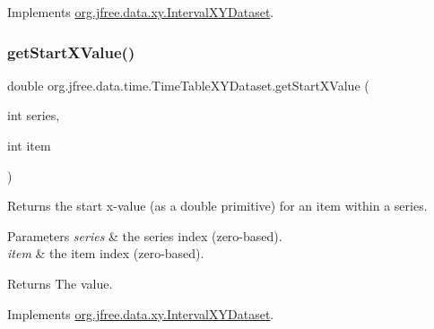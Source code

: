 Implements \mbox{\hyperlink{interfaceorg_1_1jfree_1_1data_1_1xy_1_1_interval_x_y_dataset_a7548ec7d60d72463313dc6f10aceee62}{org.\+jfree.\+data.\+xy.\+Interval\+X\+Y\+Dataset}}.

\mbox{\label{classorg_1_1jfree_1_1data_1_1time_1_1_time_table_x_y_dataset_a0173db781cf6ea359c9937b4bbac4dd1}} 
\subsubsection{\texorpdfstring{get\+Start\+X\+Value()}{getStartXValue()}}
{\footnotesize\ttfamily double org.\+jfree.\+data.\+time.\+Time\+Table\+X\+Y\+Dataset.\+get\+Start\+X\+Value (\begin{DoxyParamCaption}\item[{int}]{series,  }\item[{int}]{item }\end{DoxyParamCaption})}

Returns the start x-\/value (as a double primitive) for an item within a series.


\begin{DoxyParams}{Parameters}
{\em series} & the series index (zero-\/based). \\
\hline
{\em item} & the item index (zero-\/based).\\
\hline
\end{DoxyParams}
\begin{DoxyReturn}{Returns}
The value. 
\end{DoxyReturn}


Implements \mbox{\hyperlink{interfaceorg_1_1jfree_1_1data_1_1xy_1_1_interval_x_y_dataset_a437afe7f637a8d16ad305023a7819eef}{org.\+jfree.\+data.\+xy.\+Interval\+X\+Y\+Dataset}}.

\mbox{\label{classorg_1_1jfree_1_1data_1_1time_1_1_time_table_x_y_dataset_a7ca009f40f1b341c4a1bf7da9ef461de}} 

